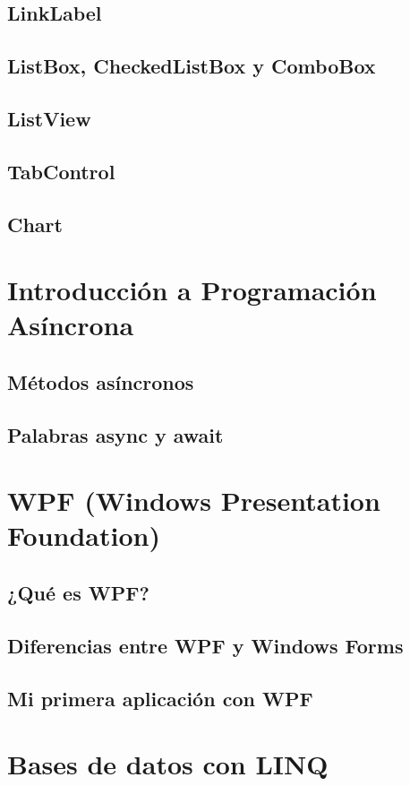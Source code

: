 \documentclass[12pt,a4paper]{report}
\begin{document}
{\section{LinkLabel}
\section{ListBox, CheckedListBox y ComboBox}
\section{ListView}
\section{TabControl}
\section{Chart}

\chapter{Introducción a Programación Asíncrona}
\section{Métodos asíncronos}
\section{Palabras async y await}

\chapter{WPF (Windows Presentation Foundation)}
\section{¿Qué es WPF?}
\section{Diferencias entre WPF y Windows Forms}
\section{Mi primera aplicación con WPF}

\chapter{Bases de datos con LINQ}
}
\end{document}
